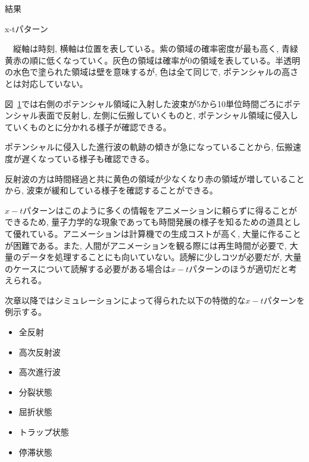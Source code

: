 \documentclass[a4paper, lualatex]{bxjsarticle}
\newcommand{\fref}[1]{図~\ref{#1}}
\begin{document}
\begin{section}{結果}
\begin{subsection}{x-tパターン\label{x-tpatturn}}
\begin{figure}[h]
            \label{example}
        \end{figure}
        \par　縦軸は時刻, 横軸は位置を表している。紫の領域の確率密度が最も高く, 青緑黄赤の順に低くなっていく。灰色の領域は確率が0の領域を表している。半透明の水色で塗られた領域は壁を意味するが, 色は全て同じで, ポテンシャルの高さとは対応していない。
        \par \fref{example}では右側のポテンシャル領域に入射した波束が5から10単位時間ごろにポテンシャル表面で反射し, 左側に伝搬していくものと, ポテンシャル領域に侵入していくものとに分かれる様子が確認できる。
        \par ポテンシャルに侵入した進行波の軌跡の傾きが急になっていることから, 伝搬速度が遅くなっている様子も確認できる。
        \par 反射波の方は時間経過と共に黄色の領域が少なくなり赤の領域が増していることから, 波束が緩和している様子を確認することができる。
        \par $x-t$パターンはこのように多くの情報をアニメーションに頼らずに得ることができるため, 量子力学的な現象であっても時間発展の様子を知るための道具として優れている。アニメーションは計算機での生成コストが高く, 大量に作ることが困難である。また, 人間がアニメーションを観る際には再生時間が必要で, 大量のデータを処理することにも向いていない。読解に少しコツが必要だが, 大量のケースについて読解する必要がある場合は$x-t$パターンのほうが適切だと考えられる。
        \par 次章以降ではシミュレーションによって得られた以下の特徴的な$x-t$パターンを例示する。
        \begin{itemize}
            \item 全反射
            \item 高次反射波
            \item 高次進行波
            \item 分裂状態
            \item 屈折状態
            \item トラップ状態
            \item 停滞状態
        \end{itemize}
    \end{subsection}


\end{section}
\end{document}
